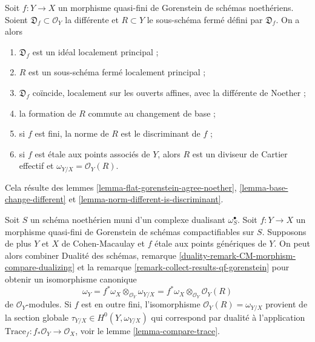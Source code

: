\begin{remark}
\label{remark-collect-results-qf-gorenstein}
Soit $f : Y \to X$ un morphisme quasi-fini de Gorenstein de schémas noethériens.
Soient $\mathfrak D_f \subset \mathcal{O}_Y$ la différente et
$R \subset Y$ le sous-schéma fermé défini par $\mathfrak D_f$.
On a alors
\begin{enumerate}
\item $\mathfrak D_f$ est un idéal localement principal ;
\item $R$ est un sous-schéma fermé localement principal ;
\item $\mathfrak D_f$ coïncide, localement sur les ouverts affines, avec la différente de Noether ;
\item la formation de $R$ commute au changement de base ;
\item si $f$ est fini, la norme de $R$ est le discriminant de $f$ ;
\item si $f$ est étale aux points associés de $Y$, alors
$R$ est un diviseur de Cartier effectif et $\omega_{Y/X} = \mathcal{O}_Y(R)$.
\end{enumerate}
Cela résulte des lemmes \ref{lemma-flat-gorenstein-agree-noether},
\ref{lemma-base-change-different} et
\ref{lemma-norm-different-is-discriminant}.
\end{remark}

\begin{remark}
\label{remark-collect-results-qf-gorenstein-two}
Soit $S$ un schéma noethérien muni d'un complexe dualisant
$\omega_S^\bullet$. Soit $f : Y \to X$ un morphisme quasi-fini de Gorenstein
de schémas compactifiables sur $S$. Supposons de plus
$Y$ et $X$ de Cohen-Macaulay et $f$ étale aux points génériques
de $Y$. On peut alors combiner
Dualité des schémas, remarque
\ref{duality-remark-CM-morphism-compare-dualizing} et la
remarque \ref{remark-collect-results-qf-gorenstein}
pour obtenir un isomorphisme canonique
$$
\omega_Y = f^*\omega_X \otimes_{\mathcal{O}_Y} \omega_{Y/X} =
f^*\omega_X \otimes_{\mathcal{O}_Y} \mathcal{O}_Y(R)
$$
de $\mathcal{O}_Y$-modules. Si $f$ est en outre fini,
l'isomorphisme $\mathcal{O}_Y(R) = \omega_{Y/X}$ provient
de la section globale $\tau_{Y/X} \in H^0(Y, \omega_{Y/X})$
qui correspond par dualité à l'application
$\text{Trace}_f : f_*\mathcal{O}_Y \to \mathcal{O}_X$, voir le
lemme \ref{lemma-compare-trace}.
\end{remark}












